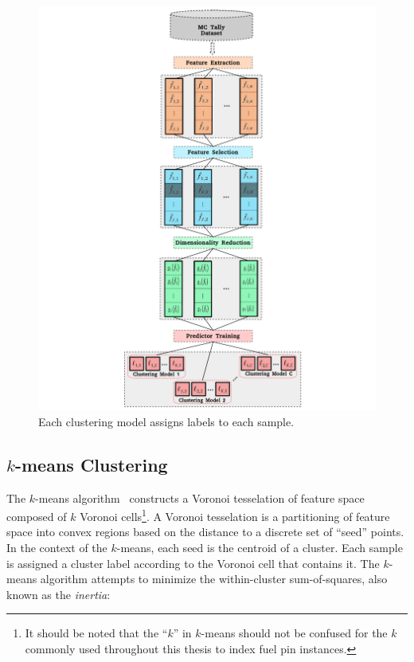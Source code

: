 \begin{figure}[h!]
\centering
\includegraphics[width=0.95\linewidth]{figures/unsupervised/features/engineering/cluster}
\vspace{2mm}
\caption[\textit{i}MGXS clustering]{Each clustering model assigns labels to each sample.}
\label{fig:chap10-cluster}
\end{figure}


\subsection{$k$-means Clustering}
\label{subsec:chap10-kmeans}

The $k$-means algorithm~\cite{macqueen1967kmeans, lloyd1982kmeans} constructs a Voronoi tesselation of feature space composed of $k$ Voronoi cells\footnote{It should be noted that the ``$k$'' in $k$-means should not be confused for the $k$ commonly used throughout this thesis to index fuel pin instances.}. A Voronoi tesselation is a partitioning of feature space into convex regions based on the distance to a discrete set of ``seed'' points. In the context of the $k$-means, each seed is the centroid of a cluster. Each sample is assigned a cluster label according to the Voronoi cell that contains it. The $k$-means algorithm attempts to minimize the within-cluster sum-of-squares, also known as the \textit{inertia}:

